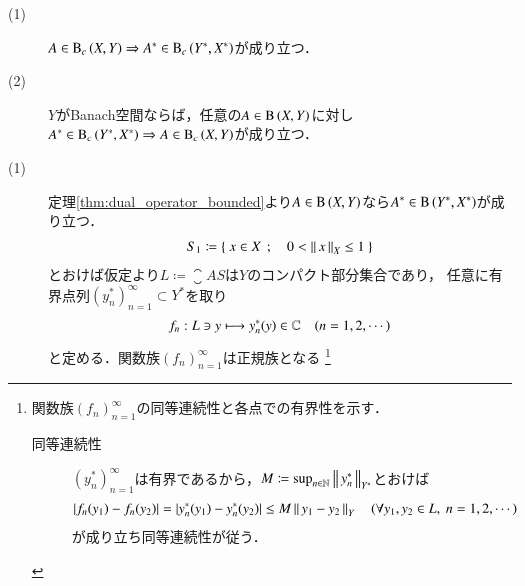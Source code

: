 	\begin{screen}
		\begin{thm}[コンパクト作用素の共役作用素のコンパクト性]\mbox{}
			\begin{description}
				\item[(1)] $A \in \mathrm{B}_c\left(X,Y\right) \Rightarrow A^* \in \mathrm{B}_c\left(Y^*,X^*\right)$が成り立つ．
				\item[(2)] $Y$がBanach空間ならば，任意の$A \in \mathrm{B}\left(X,Y\right) $に対し
					$A^* \in \mathrm{B}_c\left(Y^*,X^*\right) \Rightarrow A \in \mathrm{B}_c\left(X,Y\right) $が成り立つ．
			\end{description}
			\label{thm:dual_operator_of_compact_operators}
		\end{thm}
	\end{screen}
	
	\begin{prf}\mbox{}
		\begin{description}
			\item[(1)]
				定理\ref{thm:dual_operator_bounded}より$A \in \mathrm{B}\left(X,Y\right) $なら$A^* \in \mathrm{B}\left(Y^*,X^*\right) $が成り立つ．
				\begin{align}
					S_1 \coloneqq \left\{\ x \in X\ \, ; \quad 0 < \left\|\, x\, \right\|_{X} \leq 1\ \right\}
				\end{align}
				とおけば仮定より$L \coloneqq \closure{AS}$は$Y$のコンパクト部分集合であり，
				任意に有界点列$(y_n^*)_{n=1}^{\infty} \subset Y^*$を取り
				\begin{align}
					f_n:L \ni y \longmapsto y_n^*(y) \in \mathbb{C}
					\quad (n=1,2,\cdots)
				\end{align}
				と定める．関数族$(f_n)_{n=1}^{\infty}$は正規族となる
				\footnote{
					関数族$(f_n)_{n=1}^{\infty}$の同等連続性と各点での有界性を示す．
					\begin{description}
						\item[同等連続性]
							$(y_n^*)_{n=1}^{\infty}$は有界であるから，$M \coloneqq \operatorname*{sup}_{n\in\mathbb{N}} \left\|\, y_n^*\, \right\|_{Y^*}$とおけば
							\begin{align}
								|f_n(y_1) - f_n(y_2)| = |y_n^*(y_1) - y_n^*(y_2)| \leq M\Norm{y_1 - y_2}{Y} \quad (\forall y_1,y_2 \in L,\ n=1,2,\cdots)
							\end{align}
							が成り立ち同等連続性が従う．
						

\end{description}}
\end{description}
\end{prf}

